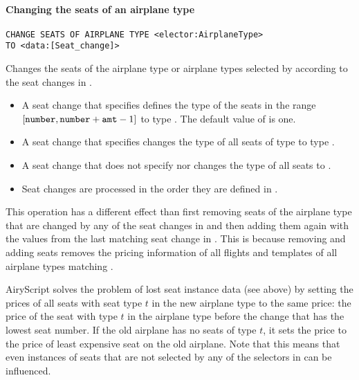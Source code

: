 \paragraph{Changing the seats of an airplane type}
\begin{operation}
  \label{op:change_seats}
  \begin{lstlisting}
CHANGE SEATS OF AIRPLANE TYPE <elector:AirplaneType>
TO <data:[Seat_change]>
  \end{lstlisting}
  \label{op:change_seats_of}
\end{operation}
Changes the seats of the airplane type or airplane types selected by
 according to the seat changes in .

\begin{itemize}
  \item A seat change that specifies  defines the type of the seats
    in the range $[\texttt{number},\texttt{number}+\texttt{amt}-1]$ to type .
    The default value of  is one.

  \item A seat change that specifies  changes the type of all
    seats of type  to type .

  \item A seat change that does not specify  nor 
    changes the type of all seats to .

  \item Seat changes are processed in the order they are defined in .
\end{itemize}

This operation has a different effect than first removing
seats of the airplane type that are changed by any of the seat changes in
 and then adding them again with the values from the last matching
seat change in . This is because removing and adding seats removes
the pricing information of all flights and templates of all airplane types
matching .

AiryScript solves the problem of lost seat instance data (see above) by setting
the prices of all seats with seat type $t$ in the new airplane type to the same
price: the price of the seat with type $t$ in the airplane type before the
change that has the lowest seat number. If the old airplane has no seats of type
$t$, it sets the price to the price of least expensive seat on the old airplane.
Note that this means that even instances of seats that are not selected by any
of the selectors in  can be influenced.

